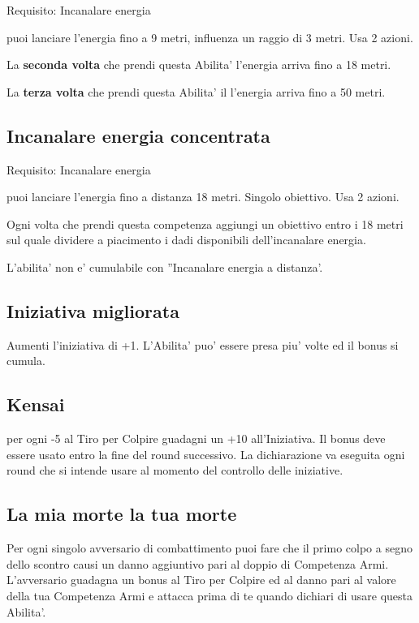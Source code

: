 \documentclass[a4paper,11pt,twoside,openany]{book}
\begin{document}
Requisito: Incanalare energia

puoi lanciare l'energia fino a 9 metri, influenza un raggio di 3 metri. Usa 2 azioni.

La \textbf{seconda volta} che prendi questa Abilita' l'energia arriva fino a 18 metri.

La \textbf{terza volta} che prendi questa Abilita' il l'energia arriva fino a 50 metri.

\subsection{Incanalare energia concentrata}

Requisito: Incanalare energia

puoi lanciare l'energia fino a distanza 18 metri. Singolo obiettivo. Usa 2 azioni.

Ogni volta che prendi questa competenza aggiungi un obiettivo entro i 18 metri sul quale dividere a piacimento i dadi disponibili dell'incanalare energia.

L'abilita' non e' cumulabile con ''Incanalare energia a distanza'.

\subsection{Iniziativa migliorata}

Aumenti l'iniziativa di +1. L'Abilita' puo' essere presa piu' volte ed il bonus si cumula.

\subsection{Kensai}

per ogni -5 al Tiro per Colpire guadagni un +10 all'Iniziativa. Il bonus deve essere usato entro la fine del round successivo. La dichiarazione va eseguita ogni round che si intende usare al momento del controllo delle iniziative.

\subsection{La mia morte la tua morte}

Per ogni singolo avversario di combattimento puoi fare che il primo colpo a segno dello scontro causi un danno aggiuntivo pari al doppio di Competenza Armi. L'avversario guadagna un bonus al Tiro per Colpire ed al danno pari al valore della tua Competenza Armi e attacca prima di te quando dichiari di usare questa Abilita'.
\end{document}

